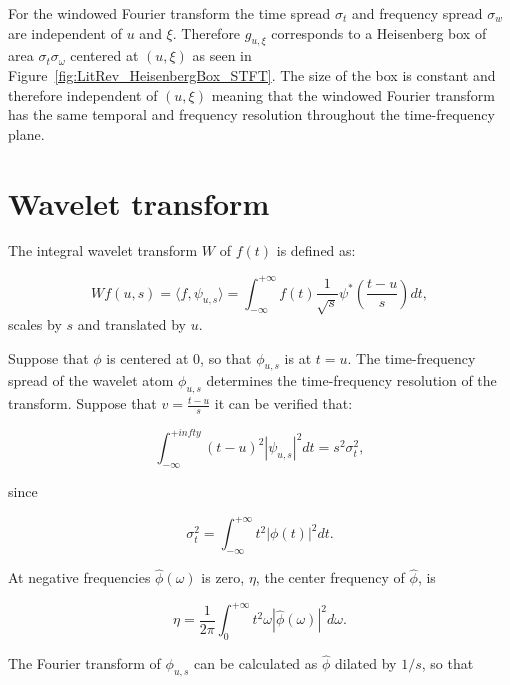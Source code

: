 For the windowed Fourier transform the time spread $\sigma_t$ and frequency spread $\sigma_w$ are independent of $u$ and $\xi$. Therefore $g_{u,\xi}$ corresponds to a Heisenberg box of area $\sigma_t \sigma_\omega$ centered at $(u,\xi)$ as seen in Figure~\ref{fig:LitRev_HeisenbergBox_STFT}\cite{Heisenberg1927}. The size of the box is constant and therefore independent of $(u,\xi)$ meaning that the windowed Fourier transform has the same temporal and frequency resolution throughout the time-frequency plane\cite{Mallat1999}.

\section{Wavelet transform}\label{ap:TimeFreqResolutionWavelet}
The integral wavelet transform $W$ of $f(t)$ is defined as:

\begin{equation}\label{eq:Mallat1999_xcopy}
W f(u,s) = \langle f, \psi_{u,s} \rangle = \int^{+\infty}_{-\infty} f(t) \frac{1}{\sqrt{s}}\psi^\ast \left( \frac{t-u}{s} \right) dt,
\end{equation}
scales by $s$ and translated by $u$\cite{Mallat1999}.

Suppose that $\phi$ is centered at 0, so that $\phi_{u,s}$ is at $t=u$. The time-frequency spread of the wavelet atom $\phi_{u,s}$ determines the time-frequency resolution of the transform. Suppose that $v = \frac{t-u}{s}$ it can be verified that:

\begin{equation}\label{eq:Mallat1999_451}
\int^{+infty}_{-\infty} (t - u)^2 |\psi_{u,s} |^2  dt = s^2 \sigma^2_t,
\end{equation}

since

\begin{equation}\label{eq:Mallat1999_4515}
\sigma_t^2 = \int^{+\infty}_{-\infty}t^2 |\phi(t)|^2 dt.
\end{equation}

At negative frequencies $\hat{\phi}(\omega)$ is zero, $\eta$, the center frequency of $\hat{\phi}$, is

\begin{equation}\label{eq:Mallat1999_452}
\eta = \frac{1}{2\pi} \int^{+\infty}_{0}t^2 \omega |\hat{\phi}(\omega)|^2 d\omega.
\end{equation}

The Fourier transform of $\phi_{u,s}$ can be calculated as $\hat{\phi}$ dilated by $1/s$, so that

